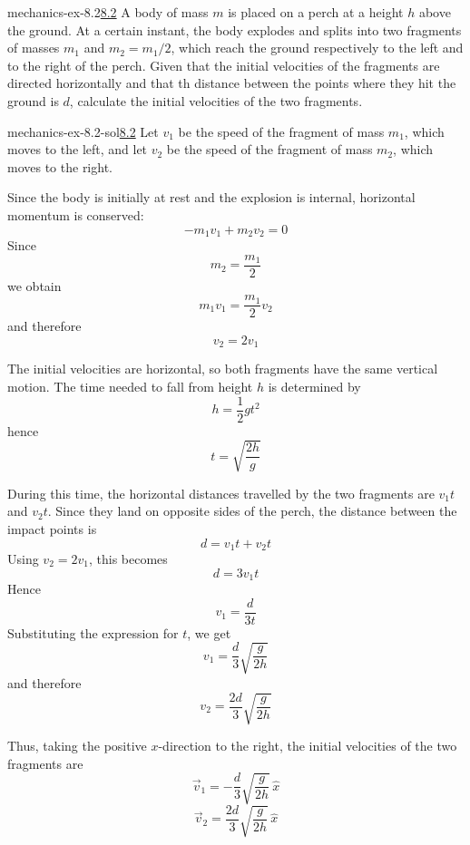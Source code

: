 \documentclass[preview]{standalone}
\begin{document}
\begin{snippetexercise}{mechanics-ex-8.2}{\underline{8.2}}
    A body of mass \(m\) is placed on a perch at a height \(h\) above the ground.
    At a certain instant, the body explodes and splits into two fragments of masses \(m_1\) and \(m_2 = m_1 / 2\),
    which reach the ground respectively to the left and to the right of the perch.
    Given that the initial velocities of the fragments are directed horizontally and that th
    distance between the points where they hit the ground is \(d\), calculate the initial velocities of
    the two fragments.
\end{snippetexercise}

\begin{snippetsolution}{mechanics-ex-8.2-sol}{\underline{8.2}}
    Let \(v_1\) be the speed of the fragment of mass \(m_1\), which moves to the
    left, and let \(v_2\) be the speed of the fragment of mass \(m_2\), which moves
    to the right.

    Since the body is initially at rest and the explosion is internal, horizontal
    momentum is conserved:
    \[
        -m_1v_1 + m_2v_2 = 0
    \]
    Since
    \[
        m_2 = \frac{m_1}{2}
    \]
    we obtain
    \[
        m_1v_1 = \frac{m_1}{2}v_2
    \]
    and therefore
    \[
        v_2 = 2v_1
    \]

    The initial velocities are horizontal, so both fragments have the same vertical
    motion. The time needed to fall from height \(h\) is determined by
    \[
        h = \frac{1}{2}gt^2
    \]
    hence
    \[
        t = \sqrt{\frac{2h}{g}}
    \]

    During this time, the horizontal distances travelled by the two fragments are
    \(v_1t\) and \(v_2t\). Since they land on opposite sides of the perch, the
    distance between the impact points is
    \[
        d = v_1t + v_2t
    \]
    Using \(v_2 = 2v_1\), this becomes
    \[
        d = 3v_1t
    \]
    Hence
    \[
        v_1 = \frac{d}{3t}
    \]
    Substituting the expression for \(t\), we get
    \[
        v_1 = \frac{d}{3}\sqrt{\frac{g}{2h}}
    \]
    and therefore
    \[
        v_2 = \frac{2d}{3}\sqrt{\frac{g}{2h}}
    \]

    Thus, taking the positive \(x\)-direction to the right, the initial velocities
    of the two fragments are
    \[
        \vec v_1 = -\frac{d}{3}\sqrt{\frac{g}{2h}}\,\hat x
    \]
    \[
        \vec v_2 = \frac{2d}{3}\sqrt{\frac{g}{2h}}\,\hat x
    \]
\end{snippetsolution}
\end{document}
